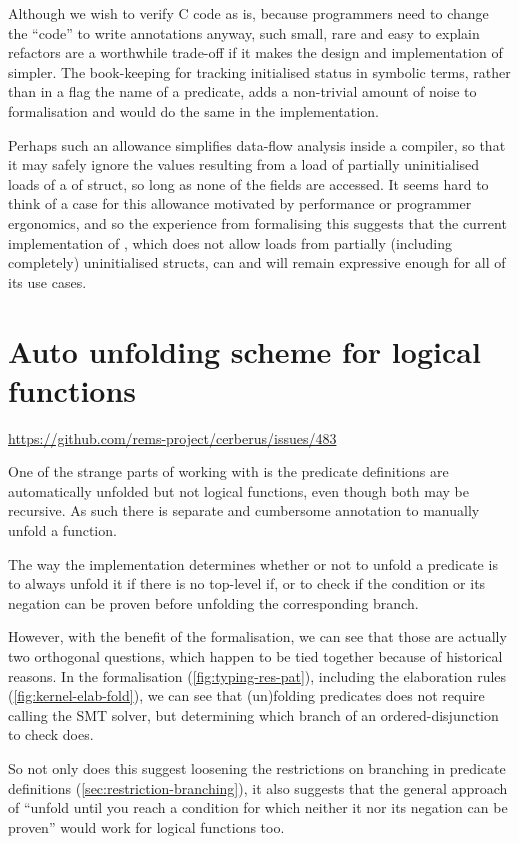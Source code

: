 Although we wish to verify C code as is, because programmers need to change the
``code'' to write annotations anyway, such small, rare and easy to explain
refactors are a worthwhile trade-off if it makes the design and implementation
of  simpler. The book-keeping for tracking initialised status in
symbolic terms, rather than in a flag the name of a predicate, adds a
non-trivial amount of noise to formalisation and would do the same in the
implementation.

Perhaps such an allowance simplifies data-flow analysis inside a compiler, so
that it may safely ignore the values resulting from a load of partially
uninitialised loads of a of struct, so long as none of the fields are accessed.
It seems hard to think of a case for this allowance motivated by performance or
programmer ergonomics, and so the experience from formalising this suggests
that the current implementation of , which does not allow loads from
partially (including completely) uninitialised structs, can and will remain
expressive enough for all of its use cases.

\section{Auto unfolding scheme for logical functions}\label{sec:auto-unfold-functions}

\url{https://github.com/rems-project/cerberus/issues/483}

One of the strange parts of working with  is the predicate definitions are
automatically unfolded but not logical functions, even though both may be
recursive. As such there is separate and cumbersome annotation to manually
unfold a function.

The way the implementation determines whether or not to unfold a predicate is
to always unfold it if there is no top-level if, or to check if the condition
or its negation can be proven before unfolding the corresponding branch.

However, with the benefit of the formalisation, we can see that those are
actually two orthogonal questions, which happen to be tied together because of
historical reasons. In the formalisation (\cref{fig:typing-res-pat}), including
the elaboration rules (\cref{fig:kernel-elab-fold}),  we can see that (un)folding %
predicates does not require calling the SMT solver, but determining which
branch of an ordered-disjunction to check does.

So not only does this suggest loosening the restrictions on branching in
predicate definitions (\cref{sec:restriction-branching}), it also suggests that
the general approach of ``unfold until you reach a condition for which neither
it nor its negation can be proven'' would work for logical functions too.

